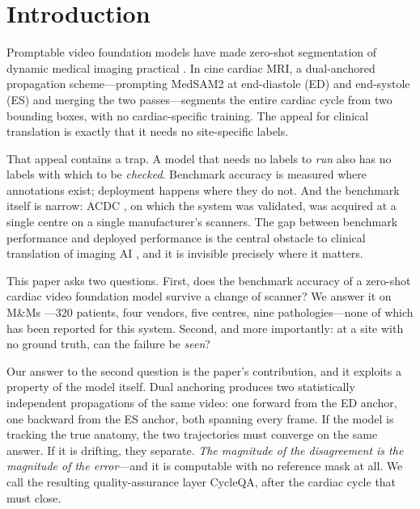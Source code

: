 \documentclass[runningheads]{llncs}
\newcommand{\CQ}{CycleQA}
\begin{document}
\section{Introduction}

Promptable video foundation models have made zero-shot segmentation of dynamic medical
imaging practical \cite{ravi2024sam2,zhu2024medsam2}. In cine cardiac MRI, a dual-anchored
propagation scheme---prompting MedSAM2 at end-diastole (ED) and end-systole (ES) and
merging the two passes---segments the entire cardiac cycle from two bounding boxes, with
no cardiac-specific training. The appeal for clinical translation
is exactly that it needs no site-specific labels.

That appeal contains a trap. A model that needs no labels to \emph{run} also has no labels
with which to be \emph{checked}. Benchmark accuracy is measured where annotations exist;
deployment happens where they do not. And the benchmark itself is narrow: ACDC
\cite{bernard2018acdc}, on which the system was validated, was acquired at a single centre
on a single manufacturer's scanners. The gap between benchmark performance and deployed
performance is the central obstacle to clinical translation of imaging AI
\cite{varoquaux2022failures,moor2023gmai}, and it is invisible precisely where it matters.

This paper asks two questions. First, does the benchmark accuracy of a zero-shot cardiac
video foundation model survive a change of scanner? We answer it on M\&Ms
\cite{campello2021mnms}---320 patients, four vendors, five centres, nine pathologies---none
of which has been reported for this system. Second, and more importantly: at a site with no
ground truth, can the failure be \emph{seen}?

Our answer to the second question is the paper's contribution, and it exploits a property
of the model itself. Dual anchoring produces two statistically independent propagations of
the same video: one forward from the ED anchor, one backward from the ES anchor, both
spanning every frame. If the model is tracking the true anatomy, the two trajectories must
converge on the same answer. If it is drifting, they separate. \emph{The magnitude of the
disagreement is the magnitude of the error}---and it is computable with no reference mask
at all. We call the resulting quality-assurance layer \CQ{}, after the cardiac cycle that
must close.
\end{document}
